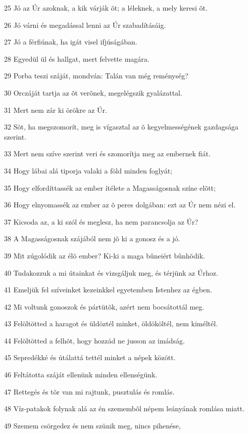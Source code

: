 \par 25 Jó az Úr azoknak, a kik várják õt; a léleknek, a mely keresi õt.
\par 26 Jó várni és megadással lenni az Úr szabadításáig.
\par 27 Jó a férfiúnak, ha igát visel ifjúságában.
\par 28 Egyedül ül és hallgat, mert felvette magára.
\par 29 Porba teszi száját, mondván: Talán van még reménység?
\par 30 Orczáját tartja az õt verõnek, megelégszik gyalázattal.
\par 31 Mert nem zár ki örökre az Úr.
\par 32 Sõt, ha megszomorít, meg is vígasztal az õ kegyelmességének gazdagsága szerint.
\par 33 Mert nem szíve szerint veri és szomorítja meg az embernek fiát.
\par 34 Hogy lábai alá tiporja valaki a föld minden foglyát;
\par 35 Hogy elfordíttassék az ember ítélete a Magasságosnak színe elõtt;
\par 36 Hogy elnyomassék az ember az õ peres dolgában: ezt az Úr nem nézi el.
\par 37 Kicsoda az, a ki szól és meglesz, ha nem parancsolja az Úr?
\par 38 A Magasságosnak szájából nem jõ ki a gonosz és a jó.
\par 39 Mit zúgolódik az élõ ember? Ki-ki a maga bûneiért bûnhõdik.
\par 40 Tudakozzuk a mi útainkat és vizsgáljuk meg, és térjünk az Úrhoz.
\par 41 Emeljük fel szíveinket kezeinkkel egyetemben Istenhez az égben.
\par 42 Mi voltunk gonoszok és pártütõk, azért nem bocsátottál meg.
\par 43 Felöltötted a haragot és üldöztél minket, öldököltél, nem kiméltél.
\par 44 Felöltötted a felhõt, hogy hozzád ne jusson az imádság.
\par 45 Sepredékké és útálattá tettél minket a népek között.
\par 46 Feltátotta száját ellenünk minden ellenségünk.
\par 47 Rettegés és tõr van mi rajtunk, pusztulás és romlás.
\par 48 Víz-patakok folynak alá az én szemembõl népem leányának romlása miatt.
\par 49 Szemem csörgedez és nem szünik meg, nincs pihenése,
